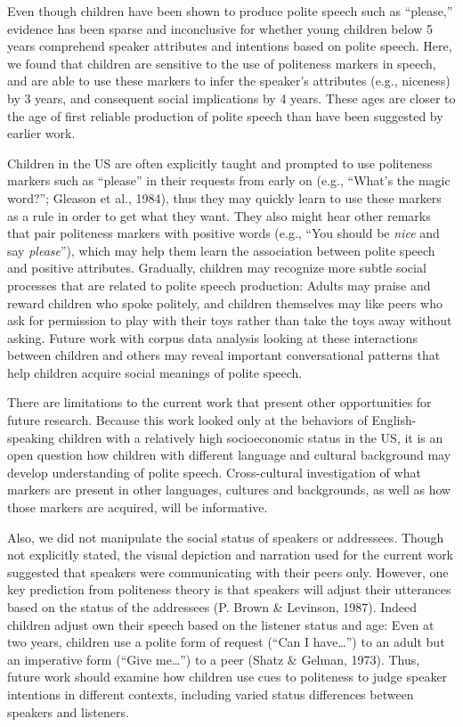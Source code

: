 \documentclass[oneside]{report}
\begin{document}
Even though children have been shown to produce polite speech such as
``please,'' evidence has been sparse and inconclusive for whether young
children below 5 years comprehend speaker attributes and intentions
based on polite speech. Here, we found that children are sensitive to
the use of politeness markers in speech, and are able to use these
markers to infer the speaker's attributes (e.g., niceness) by 3 years,
and consequent social implications by 4 years. These ages are closer to
the age of first reliable production of polite speech than have been
suggested by earlier work.

Children in the US are often explicitly taught and prompted to use
politeness markers such as ``please'' in their requests from early on
(e.g., ``What's the magic word?''; Gleason et al., 1984), thus they may
quickly learn to use these markers as a rule in order to get what they
want. They also might hear other remarks that pair politeness markers
with positive words (e.g., ``You should be \emph{nice} and say
\emph{please}''), which may help them learn the association between
polite speech and positive attributes. Gradually, children may recognize
more subtle social processes that are related to polite speech
production: Adults may praise and reward children who spoke politely,
and children themselves may like peers who ask for permission to play
with their toys rather than take the toys away without asking. Future
work with corpus data analysis looking at these interactions between
children and others may reveal important conversational patterns that
help children acquire social meanings of polite speech.

There are limitations to the current work that present other
opportunities for future research. Because this work looked only at the
behaviors of English-speaking children with a relatively high
socioeconomic status in the US, it is an open question how children with
different language and cultural background may develop understanding of
polite speech. Cross-cultural investigation of what markers are present
in other languages, cultures and backgrounds, as well as how those
markers are acquired, will be informative.

Also, we did not manipulate the social status of speakers or addressees.
Though not explicitly stated, the visual depiction and narration used
for the current work suggested that speakers were communicating with
their peers only. However, one key prediction from politeness theory is
that speakers will adjust their utterances based on the status of the
addressees (P. Brown \& Levinson, 1987). Indeed children adjust own
their speech based on the listener status and age: Even at two years,
children use a polite form of request (``Can I have\ldots{}'') to an
adult but an imperative form (``Give me\ldots{}'') to a peer (Shatz \&
Gelman, 1973). Thus, future work should examine how children use cues to
politeness to judge speaker intentions in different contexts, including
varied status differences between speakers and listeners.
\end{document}
